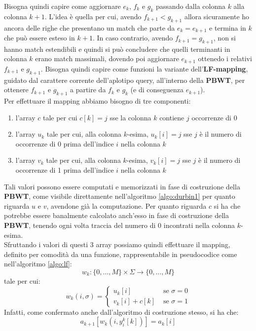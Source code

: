 Bisogna quindi capire come aggiornare $e_k$, $f_k$ e $g_k$ passando dalla
colonna $k$ alla colonna $k+1$. L'idea è quella per cui, avendo
$f_{k+1}<g_{k+1}$ allora sicuramente ho ancora delle righe che presentano un
match che parte da $e_k=e_{k+1}$ e termina in $k$ che può essere esteso in
$k+1$. In caso contrario, avendo $f_{k+1}=g_{k+1}$, non si hanno match
estendibili e quindi si può concludere che quelli terminanti in colonna $k$
erano match massimali, dovendo poi aggiornare $e_{k+1}$ ottenedo i relativi
$f_{k+1}$ e $g_{k+1}$. Bisogna quindi capire come funzioni la
variante dell'\textbf{LF-mapping}, guidato dal carattere corrente dell'aplotipo
query, all'interno della \textbf{PBWT}, per ottenere $f_{k+1}$ e $g_{k+1}$ a
partire da $f_k$ e $g_k$ (e di conseguenza $e_{k+1}$).\\ 
Per effettuare il mapping abbiamo bisogno di tre componenti:
\begin{enumerate}
  \item l'array $c$ tale per cui $c[k]=j$ sse la colonna $k$ contiene $j$
  occorrenze di 0
  \item l'array $u_k$ tale per cui, alla colonna $k$-esima, $u_k[i]=j$ sse $j$ è
  il numero di occorrenze di 0 prima dell'indice $i$ nella colonna $k$
  \item l'array $v_k$ tale per cui, alla colonna $k$-esima, $v_k[i]=j$ sse $j$ è
  il numero di occorrenze di 1 prima dell'indice $i$ nella colonna $k$ 
\end{enumerate}
Tali valori possono essere computati e memorizzati in fase di costruzione della
\textbf{PBWT}, come visibile direttamente nell'algoritmo \ref{algo:durbin1} per
quanto riguarda $u$ e $v$, avendone già la computazione. Per quanto riguarda $c$
si ha che potrebbe essere banalmente calcolato anch'esso in fase di costruzione
della \textbf{PBWT}, tenendo ogni volta traccia del numero di 0 incontrati
nella colonna $k$-esima.\\
Sfruttando i valori di questi 3 array possiamo quindi effettuare il mapping,
definito per comodità da una funzione, rappresentabile in pseudocodice come
nell'algoritmo \ref{algo:lf}:
\[w_k:\{0,\ldots,M\}\times\Sigma\to \{0,\ldots,M\}\]
tale per cui:
\[w_k(i,\sigma)=
  \begin{cases}
    u_k[i]&\mbox{ se }\sigma=0\\
    v_k[i]+c[k]&\mbox{ se }\sigma=1
  \end{cases}
\]
Infatti, come confermato anche dall'algoritmo di costruzione stesso, si ha che:
\[a_{k+1}\left[w_k\left(i,y_i^k[k]\right)\right]=a_k[i]\]
